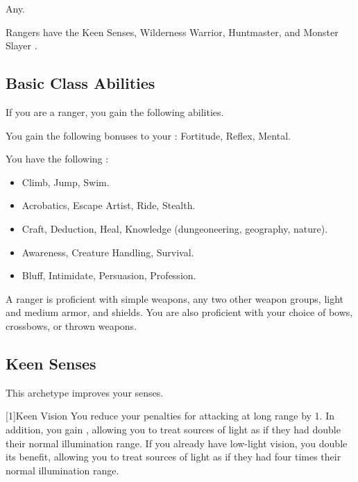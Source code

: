      Any.

     Rangers have the Keen Senses, Wilderness Warrior, Huntmaster, and Monster Slayer .

    \subsection{Basic Class Abilities}
        If you are a ranger, you gain the following abilities.

        You gain the following bonuses to your :  Fortitude,  Reflex,  Mental.

        You have the following :
        \begin{itemize}
            \item {} Climb, Jump, Swim.
            \item {} Acrobatics, Escape Artist, Ride, Stealth.
            \item {} Craft, Deduction, Heal, Knowledge (dungeoneering, geography, nature).
            \item {} Awareness, Creature Handling, Survival.
            \item {} Bluff, Intimidate, Persuasion, Profession.
        \end{itemize}

        A ranger is proficient with simple weapons, any two other weapon groups, light and medium armor, and shields.
        You are also proficient with your choice of bows, crossbows, or thrown weapons.

    \subsection{Keen Senses}
        This archetype improves your senses.

        [1]{Keen Vision}
        You reduce your  penalties for attacking at long range by 1.
        In addition, you gain , allowing you to treat sources of light as if they had double their normal illumination range.
        If you already have low-light vision, you double its benefit, allowing you to treat sources of light as if they had four times their normal illumination range.

